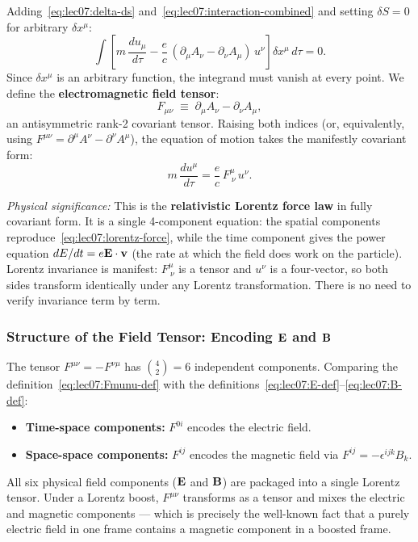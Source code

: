 Adding~\eqref{eq:lec07:delta-ds} and~\eqref{eq:lec07:interaction-combined} and
setting $\delta S = 0$ for arbitrary $\delta x^\mu$:
\begin{equation}\label{eq:lec07:variation-zero}
    \int\!\left[
        m\,\frac{du_\mu}{d\tau}
        - \frac{e}{c}\,(\partial_\mu A_\nu - \partial_\nu A_\mu)\,u^\nu
    \right]\delta x^\mu\,d\tau = 0 .
\end{equation}
Since $\delta x^\mu$ is an arbitrary function, the integrand must vanish at
every point.  We define the \textbf{electromagnetic field tensor}:
\begin{equation}\label{eq:lec07:Fmunu-def}
    \boxed{F_{\mu\nu} \;\equiv\; \partial_\mu A_\nu - \partial_\nu A_\mu ,}
\end{equation}
an antisymmetric rank-2 covariant tensor.  Raising both indices (or,
equivalently, using $F^{\mu\nu} = \partial^\mu A^\nu - \partial^\nu A^\mu$),
the equation of motion takes the manifestly covariant form:
\begin{equation}\label{eq:lec07:covariant-EOM}
    \boxed{m\,\frac{du^\mu}{d\tau}
    = \frac{e}{c}\,F^{\mu}_{\ \nu}\,u^\nu .}
\end{equation}

\textit{Physical significance:}  This is the \textbf{relativistic Lorentz force
law} in fully covariant form.  It is a single 4-component equation: the spatial
components reproduce~\eqref{eq:lec07:lorentz-force}, while the time component
gives the power equation $dE/dt = e\mathbf{E}\cdot\mathbf{v}$ (the rate at which the field does
work on the particle).  Lorentz invariance is manifest: $F^{\mu}_{\ \nu}$ is a
tensor and $u^\nu$ is a four-vector, so both sides transform identically under
any Lorentz transformation.  There is no need to verify invariance term by term.

\subsubsection*{Structure of the Field Tensor: Encoding $\mathbf{E}$ and $\mathbf{B}$}

The tensor $F^{\mu\nu} = -F^{\nu\mu}$ has $\binom{4}{2} = 6$ independent
components.  Comparing the definition~\eqref{eq:lec07:Fmunu-def} with the
definitions~\eqref{eq:lec07:E-def}--\eqref{eq:lec07:B-def}:
\begin{itemize}
    \item \textbf{Time-space components:} $F^{0i}$ encodes the electric field.
    \item \textbf{Space-space components:} $F^{ij}$ encodes the magnetic field
      via $F^{ij} = -\epsilon^{ijk}B_k$.
\end{itemize}
All six physical field components ($\mathbf{E}$ and $\mathbf{B}$) are packaged into a single
Lorentz tensor.  Under a Lorentz boost, $F^{\mu\nu}$ transforms as a tensor
and mixes the electric and magnetic components — which is precisely the
well-known fact that a purely electric field in one frame contains a magnetic
component in a boosted frame.

